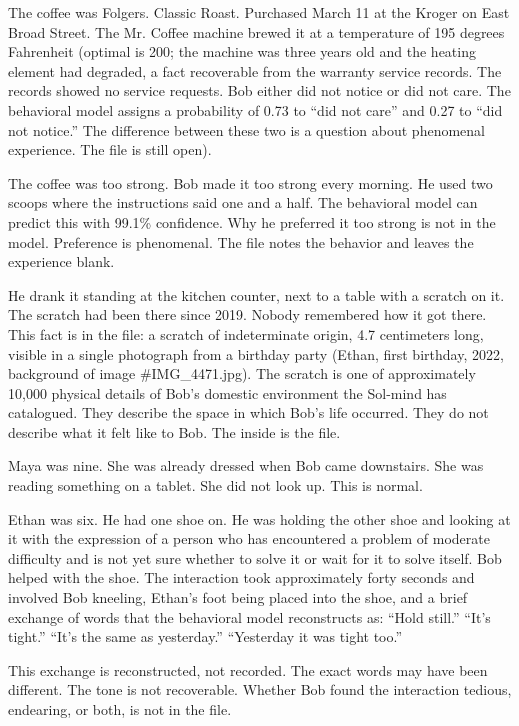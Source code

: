 The coffee was Folgers. Classic Roast. Purchased March 11 at the Kroger on East Broad Street. The Mr. Coffee machine brewed it at a temperature of 195 degrees Fahrenheit (optimal is 200; the machine was three years old and the heating element had degraded, a fact recoverable from the warranty service records. The records showed no service requests. Bob either did not notice or did not care. The behavioral model assigns a probability of 0.73 to ``did not care'' and 0.27 to ``did not notice.'' The difference between these two is a question about phenomenal experience. The file is still open).

The coffee was too strong. Bob made it too strong every morning. He used two scoops where the instructions said one and a half. The behavioral model can predict this with 99.1\% confidence. Why he preferred it too strong is not in the model. Preference is phenomenal. The file notes the behavior and leaves the experience blank.

He drank it standing at the kitchen counter, next to a table with a scratch on it. The scratch had been there since 2019. Nobody remembered how it got there. This fact is in the file: a scratch of indeterminate origin, 4.7 centimeters long, visible in a single photograph from a birthday party (Ethan, first birthday, 2022, background of image \#IMG\_4471.jpg). The scratch is one of approximately 10,000 physical details of Bob's domestic environment the Sol-mind has catalogued. They describe the space in which Bob's life occurred. They do not describe what it felt like to Bob. The inside is the file.

\bigskip

Maya was nine. She was already dressed when Bob came downstairs. She was reading something on a tablet. She did not look up. This is normal.

Ethan was six. He had one shoe on. He was holding the other shoe and looking at it with the expression of a person who has encountered a problem of moderate difficulty and is not yet sure whether to solve it or wait for it to solve itself. Bob helped with the shoe. The interaction took approximately forty seconds and involved Bob kneeling, Ethan's foot being placed into the shoe, and a brief exchange of words that the behavioral model reconstructs as: ``Hold still.'' ``It's tight.'' ``It's the same as yesterday.'' ``Yesterday it was tight too.''

This exchange is reconstructed, not recorded. The exact words may have been different. The tone is not recoverable. Whether Bob found the interaction tedious, endearing, or both, is not in the file.


